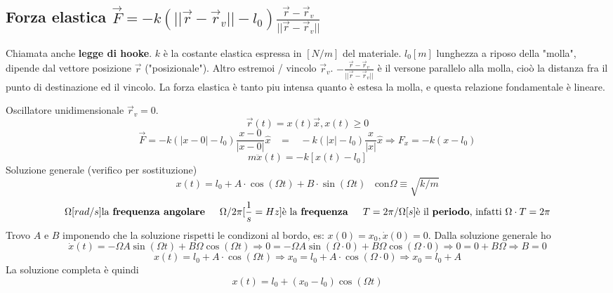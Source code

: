 \subsection{Forza elastica $\vec{F} = -k (||\vec{r} - \vec{r}_v|| - l_0)\frac{\vec{r}-\vec{r}_v}{||\vec{r}-\vec{r}_v||}$}
Chiamata anche \textbf{legge di hooke}. $k$ è la costante elastica espressa in $[N/m]$ del materiale. $l_0 [m]$ lunghezza a riposo della "molla", 
dipende dal vettore posizione $\vec{r}$ ("posizionale"). Altro estremoi / vincolo $\vec{r}_v$.
$-\frac{\vec{r}-\vec{r}_v}{||\vec{r}-\vec{r}_v||}$ è il versone parallelo alla molla, cioò la distanza fra il punto di destinazione ed il vincolo.
La forza elastica è tanto piu intensa quanto è estesa la molla, e questa relazione fondamentale è lineare.
\begin{example}
    Oscillatore unidimensionale $\vec{r}_v = 0$.
    $$\vec{r}(t) = x(t)\vec{x}, x(t)\geq 0$$
    $$\vec{F}= -k(|x-0| - l_0)\frac{x - 0}{|x - 0|}\hat{x} \hspace{10pt} = \hspace{10pt} -k(|x| - l_0)\frac{x}{|x|}\hat{x} \Rightarrow F_x = -k(x-l_0)$$
    $$m\ddot{x}(t) = -k[x(t) - l_0]$$
    Soluzione generale (verifico per sostituzione)
    $$x(t) = l_0 + A \cdot \cos(\Omega t) + B \cdot \sin(\Omega t) \:\:\:\: \text{con} \Omega \equiv \sqrt{k/m}$$
    $$\Omega[rad/s] \text{la \textbf{frequenza angolare}} \hspace{15pt} \Omega/2\pi [\frac{1}{s} = Hz] \text{è la \textbf{frequenza}} \hspace{15pt} T = 2\pi/\Omega [s] \text{è il \textbf{periodo}, infatti } \Omega \cdot T = 2\pi$$ 
    Trovo $A$ e $B$ imponendo che la soluzione rispetti le condizoni al bordo, es: $x(0) = x_0, \dot{x}(0) = 0$. 
    Dalla soluzione generale ho 
    $$\dot{x}(t) = -\Omega A \sin(\Omega t) + B \Omega \cos(\Omega t) \Rightarrow 0 = -\Omega A \sin(\Omega \cdot 0) + B \Omega \cos(\Omega \cdot 0) \Rightarrow 0 = 0 + B\Omega \Rightarrow B = 0$$
    $$x(t) = l_0 + A \cdot \cos(\Omega t) \Rightarrow x_0 = l_0 + A \cdot \cos(\Omega \cdot 0) \Rightarrow x_0 = l_0 + A$$
    La soluzione completa è quindi
    $$x(t) = l_0 + (x_0 - l_0) \cos(\Omega t)$$
\end{example}

